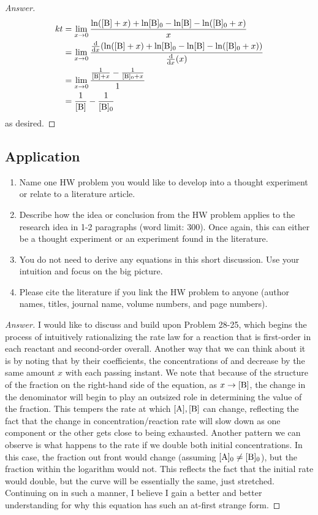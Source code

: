 \documentclass[../psets.tex]{subfiles}
\begin{document}
\begin{enumerate}[label={\textbf{28-\arabic*.}},leftmargin=3.5em]
\begin{proof}[Answer]
\begin{align*}
            kt &= \lim_{x\to 0}\frac{\ln([\ce{B}]+x)+\ln[\ce{B}]_0-\ln[\ce{B}]-\ln([\ce{B}]_0+x)}{x}\\
            &= \lim_{x\to 0}\frac{\dv{x}(\ln([\ce{B}]+x)+\ln[\ce{B}]_0-\ln[\ce{B}]-\ln([\ce{B}]_0+x))}{\dv{x}(x)}\\
            &= \lim_{x\to 0}\frac{\frac{1}{[\ce{B}]+x}-\frac{1}{[\ce{B}]_0+x}}{1}\\
            &= \frac{1}{[\ce{B}]}-\frac{1}{[\ce{B}]_0}
        \end{align*}
        as desired.
    \end{proof}
\end{enumerate}


\subsection*{Application}
\begin{enumerate}[label={\arabic*)}]
    \item Name one HW problem you would like to develop into a thought experiment or relate to a literature article.
    \item Describe how the idea or conclusion from the HW problem applies to the research idea in 1-2 paragraphs (word limit: 300). Once again, this can either be a thought experiment or an experiment found in the literature.
    \item You do not need to derive any equations in this short discussion. Use your intuition and focus on the big picture.
    \item Please cite the literature if you link the HW problem to anyone (author names, titles, journal name, volume numbers, and page numbers).
\end{enumerate}
\begin{proof}[Answer]
    I would like to discuss and build upon Problem 28-25, which begins the process of intuitively rationalizing the rate law for a reaction that is first-order in each reactant and second-order overall. Another way that we can think about it is by noting that by their coefficients, the concentrations of  and  decrease by the same amount $x$ with each passing instant. We note that because of the structure of the fraction on the right-hand side of the equation, as $x\to[\ce{B}]$, the change in the denominator will begin to play an outsized role in determining the value of the fraction. This tempers the rate at which $[\ce{A}],[\ce{B}]$ can change, reflecting the fact that the change in concentration/reaction rate will slow down as one component or the other gets close to being exhausted. Another pattern we can observe is what happens to the rate if we double both initial concentrations. In this case, the fraction out front would change (assuming $[\ce{A}]_0\neq[\ce{B}]_0$), but the fraction within the logarithm would not. This reflects the fact that the initial rate would double, but the curve will be essentially the same, just stretched. Continuing on in such a manner, I believe I gain a better and better understanding for why this equation has such an at-first strange form.
\end{proof}
\end{document}
